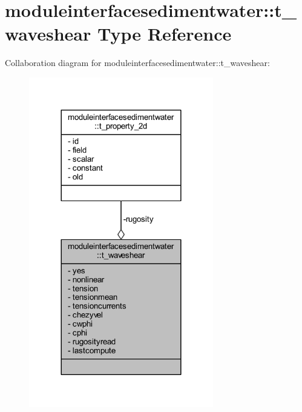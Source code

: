 \hypertarget{structmoduleinterfacesedimentwater_1_1t__waveshear}{}\section{moduleinterfacesedimentwater\+:\+:t\+\_\+waveshear Type Reference}
\label{structmoduleinterfacesedimentwater_1_1t__waveshear}


Collaboration diagram for moduleinterfacesedimentwater\+:\+:t\+\_\+waveshear\+:\nopagebreak
\begin{figure}[H]
\begin{center}
\leavevmode
\includegraphics[width=228pt]{structmoduleinterfacesedimentwater_1_1t__waveshear__coll__graph}
\end{center}
\end{figure}
